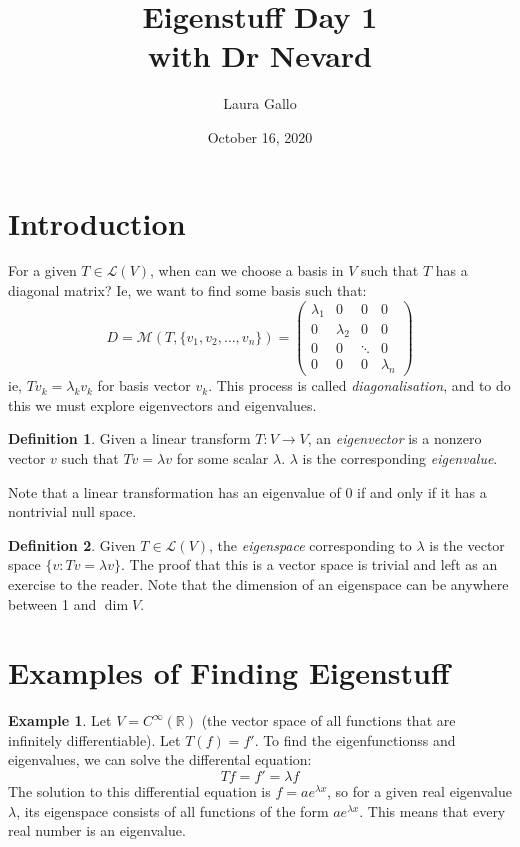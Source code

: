 \documentclass{article}
\title{Eigenstuff Day 1 \\ with Dr Nevard}
\author{Laura Gallo}
\date{October 16, 2020}
\theoremstyle{definition}
\newtheorem{definition}{Definition}
\newtheorem{examples}{Example}[section]
\begin{document}
\maketitle

\section{Introduction}
For a given $T\in\mathcal{L}(V)$, when can we choose a basis in $V$ such that $T$ has a diagonal matrix? Ie, we want to find some basis such that:
\begin{equation*}
	D=\mathcal{M}(T,\{v_1,v_2,\dots,v_n\})=\left(
		\begin{matrix}
			\lambda_1 & 0 & 0 & 0 \\
			0 & \lambda_2 & 0 & 0 \\
			0 & 0 & \ddots & 0 \\
			0 & 0 & 0 & \lambda_n
		\end{matrix}
	\right)
\end{equation*}
ie, $Tv_k=\lambda_kv_k$ for basis vector $v_k$. This process is called \emph{diagonalisation}, and to do this we must explore eigenvectors and eigenvalues.

\begin{definition}
	Given a linear transform $T:V\rightarrow V$, an \emph{eigenvector} is a nonzero vector $v$ such that $Tv=\lambda v$ for some scalar $\lambda$. $\lambda$ is the corresponding \emph{eigenvalue}.
\end{definition}

\noindent
Note that a linear transformation has an eigenvalue of 0 if and only if it has a nontrivial null space.

\begin{definition}
	Given $T\in\mathcal{L}(V)$, the \emph{eigenspace} corresponding to $\lambda$ is the vector space $\{v:Tv=\lambda v\}$. The proof that this is a vector space is trivial and left as an exercise to the reader. Note that the dimension of an eigenspace can be anywhere between 1 and $\dim V$.
\end{definition}

\section{Examples of Finding Eigenstuff}
\begin{examples}
	Let $V=C^\infty(\mathbb{R})$ (the vector space of all functions that are infinitely differentiable). Let $T(f)=f'$. To find the eigenfunctionss and eigenvalues, we can solve the differental equation:
	$$Tf=f'=\lambda f$$
	The solution to this differential equation is $f=ae^{\lambda x}$, so for a given real eigenvalue $\lambda$, its eigenspace consists of all functions of the form $ae^{\lambda x}$. This means that every real number is an eigenvalue.
\end{examples}
\end{document}
